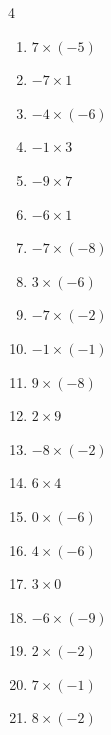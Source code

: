 \begin{multicols}{4}
\begin{enumerate}
  \item $7\times (-5)$
        \phantom{$=-35$}

  \item $-7\times 1$
        \phantom{$=-7$}

  \item $-4\times (-6)$
        \phantom{$=24$}

  \item $-1\times 3$
        \phantom{$=-3$}

  \item $-9\times 7$
        \phantom{$=-63$}

  \item $-6\times 1$
        \phantom{$=-6$}

  \item $-7\times (-8)$
        \phantom{$=56$}

  \item $3\times (-6)$
        \phantom{$=-18$}

  \item $-7\times (-2)$
        \phantom{$=14$}

  \item $-1\times (-1)$
        \phantom{$=1$}

  \item $9\times (-8)$
        \phantom{$=-72$}

  \item $2\times 9$
        \phantom{$=18$}

  \item $-8\times (-2)$
        \phantom{$=16$}

  \item $6\times 4$
        \phantom{$=24$}

  \item $0\times (-6)$
        \phantom{$=0$}

  \item $4\times (-6)$
        \phantom{$=-24$}

  \item $3\times 0$
        \phantom{$=0$}

  \item $-6\times (-9)$
        \phantom{$=54$}

  \item $2\times (-2)$
        \phantom{$=-4$}

  \item $7\times (-1)$
        \phantom{$=-7$}

  \item $8\times (-2)$
        \phantom{$=-16$}


\end{enumerate}
\end{multicols}
